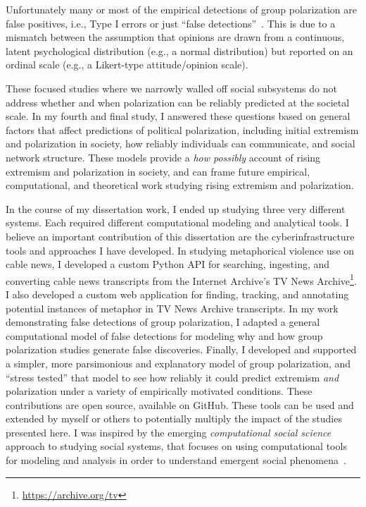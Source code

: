 \documentclass[12pt,letterpaper]{article}
\begin{document}
Unfortunately many or most of the empirical detections of group polarization
are false positives, i.e., Type I errors or just
``false detections''~\cite{Turner2021a}. This is due to a mismatch between 
the assumption that opinions are drawn from a continuous, latent psychological
distribution (e.g., a normal distribution) but reported on an ordinal
scale (e.g., a Likert-type attitude/opinion scale).

These focused studies where we narrowly walled off social subsystems do not
address whether and when polarization can be reliably predicted at the
societal scale. In my fourth and final study, I answered these questions
based on general factors that affect predictions of political polarization, 
including initial extremism and polarization in society, how reliably individuals
can communicate, and social network structure. These models provide a
\emph{how possibly} account of rising extremism and polarization in society,
and can frame future empirical, computational, and theoretical work 
studying rising extremism and polarization.

In the course of my dissertation work, I ended up studying three very 
different systems. Each required different computational modeling and analytical
tools. I believe an important contribution of this dissertation are the
cyberinfrastructure tools and approaches I have developed. In studying
metaphorical violence use on cable news, I developed a custom Python API
for searching, ingesting, and converting cable news transcripts from the
Internet Archive's TV News Archive\footnote{\url{https://archive.org/tv}}. 
I also developed a custom web application for finding, tracking, and annotating 
potential instances of metaphor in TV News Archive transcripts. 
In my work demonstrating false detections of group polarization, I adapted
a general computational model of false detections for modeling why and how
group polarization studies generate false discoveries. Finally, I developed and
supported a simpler, more parsimonious and explanatory model of group polarization,
and ``stress tested'' that model to see how reliably it could predict 
extremism \emph{and} polarization under a variety of empirically motivated
conditions.  These contributions are open
source, available on GitHub. These tools can be used and extended by myself or
others to potentially multiply the impact of the studies presented here.
I was inspired by the emerging \emph{computational social science} approach
to studying social systems, that focuses on using computational tools for
modeling and analysis in order to understand emergent social 
phenomena~\cite{Lazer2009}.
\end{document}
